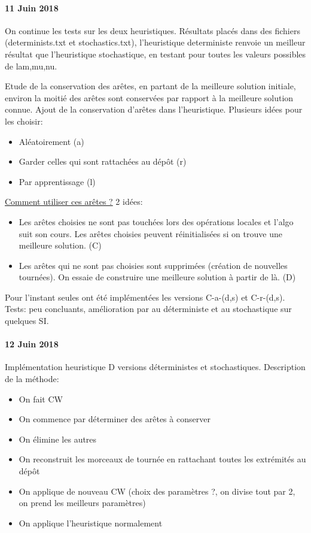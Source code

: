 \documentclass[a4paper,11pt]{article}%
\begin{document}
\paragraph*{11 Juin 2018}
On continue les tests sur les deux heuristiques. Résultats placés dans des fichiers (determinists.txt et stochastics.txt), l'heuristique deterministe renvoie un meilleur résultat que l'heuristique stochastique, en testant pour toutes les valeurs possibles de lam,mu,nu. 

Etude de la conservation des arêtes, en partant de la meilleure solution initiale, environ la moitié des arêtes sont conservées par rapport à la meilleure solution connue. Ajout de la conservation d'arêtes dans l'heuristique. Plusieurs idées pour les choisir: 
\begin{itemize}
\item Aléatoirement (a)
\item Garder celles qui sont rattachées au dépôt (r)
\item Par apprentissage (l)
\end{itemize}
\underline{Comment utiliser ces arêtes ?}
2 idées:
\begin{itemize}
\item Les arêtes choisies ne sont pas touchées lors des opérations locales et l'algo suit son cours. Les arêtes choisies peuvent réinitialisées si on trouve une meilleure solution. (C)
\item Les arêtes qui ne sont pas choisies sont supprimées (création de nouvelles tournées). On essaie de construire une meilleure solution à partir de là. (D)
\end{itemize}

Pour l'instant seules ont été implémentées les versions C-a-(d,s) et C-r-(d,s). Tests: peu concluants, amélioration par au déterministe et au stochastique sur quelques SI.

\paragraph*{12 Juin 2018}
 Implémentation heuristique D versions déterministes et stochastiques. Description de la méthode:
 \begin{itemize}
 \item On fait CW
 \item On commence par déterminer des arêtes à conserver
 \item On élimine les autres 
 \item On reconstruit les morceaux de tournée en rattachant toutes les extrémités au dépôt
 \item On applique de nouveau CW (choix des paramètres ?, on divise tout par 2, on prend les meilleurs paramètres)
 \item On applique l'heuristique normalement
\end{itemize}
\end{document}
